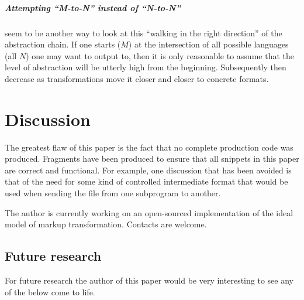 \documentclass{scrreprt}
\begin{document}
\paragraph{Attempting ``M-to-N'' instead of ``N-to-N''} seem to be another way to look at this ``walking in the right direction'' of the abstraction chain. If one starts ($M$) at the intersection of all possible languages (all $N$) one may want to output to, then it is only reasonable to assume that the level of abstraction will be utterly high from the beginning. Subsequently then decrease as transformations move it closer and closer to concrete formats.




















%
%
%
%
%
%


\chapter{Discussion}
The greatest flaw of this paper is the fact that no complete production code was produced. Fragments have been produced to ensure that all snippets in this paper are correct and functional. For example, one discussion that has been avoided is that of the need for some kind of controlled intermediate format that would be used when sending the file from one subprogram to another.

The author is currently working on an open-sourced implementation of the ideal model of markup transformation. Contacts are welcome.







\section{Future research}
For future research the author of this paper would be very interesting to see any of the below come to life.
\end{document}
